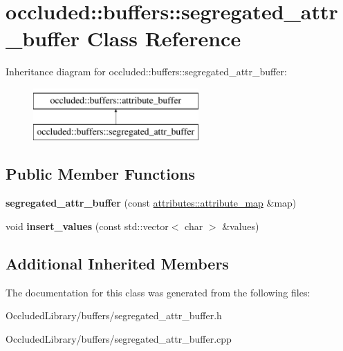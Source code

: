 \hypertarget{classoccluded_1_1buffers_1_1segregated__attr__buffer}{\section{occluded\+:\+:buffers\+:\+:segregated\+\_\+attr\+\_\+buffer Class Reference}
\label{classoccluded_1_1buffers_1_1segregated__attr__buffer}
}
Inheritance diagram for occluded\+:\+:buffers\+:\+:segregated\+\_\+attr\+\_\+buffer\+:\begin{figure}[H]
\begin{center}
\leavevmode
\includegraphics[height=2.000000cm]{classoccluded_1_1buffers_1_1segregated__attr__buffer}
\end{center}
\end{figure}
\subsection*{Public Member Functions}
\begin{DoxyCompactItemize}
\item 
\hypertarget{classoccluded_1_1buffers_1_1segregated__attr__buffer_ab822a9e4ccf2be069418224fc2663622}{{\bfseries segregated\+\_\+attr\+\_\+buffer} (const \hyperlink{classoccluded_1_1buffers_1_1attributes_1_1attribute__map}{attributes\+::attribute\+\_\+map} \&map)}\label{classoccluded_1_1buffers_1_1segregated__attr__buffer_ab822a9e4ccf2be069418224fc2663622}

\item 
\hypertarget{classoccluded_1_1buffers_1_1segregated__attr__buffer_aeb8e81bdc65a9c7b002632c4ebb44ef1}{void {\bfseries insert\+\_\+values} (const std\+::vector$<$ char $>$ \&values)}\label{classoccluded_1_1buffers_1_1segregated__attr__buffer_aeb8e81bdc65a9c7b002632c4ebb44ef1}

\end{DoxyCompactItemize}
\subsection*{Additional Inherited Members}


The documentation for this class was generated from the following files\+:\begin{DoxyCompactItemize}
\item 
Occluded\+Library/buffers/segregated\+\_\+attr\+\_\+buffer.\+h\item 
Occluded\+Library/buffers/segregated\+\_\+attr\+\_\+buffer.\+cpp\end{DoxyCompactItemize}

